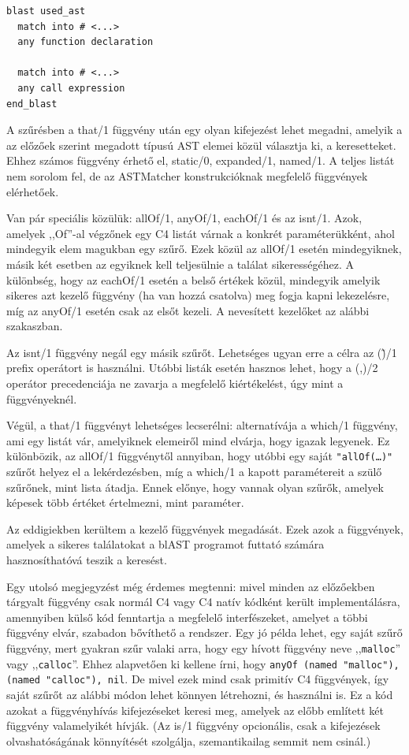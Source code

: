 \begin{lstlisting}
blast used_ast
  match into # <...>
  any function declaration

  match into # <...>
  any call expression
end_blast
\end{lstlisting}

A szűrésben a \cfn that/1 függvény után egy olyan kifejezést lehet megadni, amelyik a az előzőek szerint megadott típusú \gls{AST} elemei közül választja ki, a keresetteket.
Ehhez számos függvény érhető el, \pl \cfn static/0, \cfn expanded/1, \cfn named/1.
A teljes listát nem sorolom fel, de az ASTMatcher konstrukcióknak megfelelő függvények elérhetőek.

Van pár speciális közülük: \cfn allOf/1, \cfn anyOf/1, \cfn eachOf/1 és az \cfn isnt/1.
Azok, amelyek ,,Of''-al végzőnek egy C4 listát várnak a konkrét paraméterükként, ahol mindegyik elem magukban egy szűrő.
Ezek közül az \cfn allOf/1 esetén mindegyiknek, másik két esetben az egyiknek kell teljesülnie a találat sikerességéhez.
A különbség, hogy az \cfn eachOf/1 esetén a belső értékek közül, mindegyik amelyik sikeres azt kezelő függvény (ha van hozzá csatolva) meg fogja kapni lekezelésre, míg az \cfn anyOf/1 esetén csak az elsőt kezeli.
A nevesített kezelőket \ld az alábbi szakaszban.

Az \cfn isnt/1 függvény negál egy másik szűrőt.
Lehetséges ugyan erre a célra az \cfn (\~)/1 prefix operátort is használni.
Utóbbi listák esetén hasznos lehet, hogy a \cfn (,)/2 operátor precedenciája ne zavarja a megfelelő kiértékelést, úgy mint a függvényeknél.

Végül, a \cfn that/1 függvényt lehetséges lecserélni: alternatívája a \cfn which/1 függvény, ami egy listát vár, amelyiknek elemeiről mind elvárja, hogy igazak legyenek.
Ez különbözik, az \cfn allOf/1 függvénytől annyiban, hogy utóbbi egy saját {\tt "allOf(\dots)"} szűrőt helyez el a lekérdezésben, míg a \cfn which/1 a kapott paramétereit a szülő szűrőnek, mint lista átadja.
Ennek előnye, hogy vannak olyan szűrők, amelyek képesek több értéket értelmezni, mint paraméter.

Az eddigiekben kerültem a kezelő függvények megadását.
Ezek azok a függvények, amelyek a sikeres találatokat a blAST programot futtató számára hasznosíthatóvá teszik a keresést.

Egy utolsó megjegyzést még érdemes megtenni: mivel minden az előzőekben tárgyalt függvény csak normál C4 vagy C4 natív kódként került implementálásra, amennyiben külső kód fenntartja a megfelelő interfészeket, amelyet a többi függvény elvár, szabadon bővíthető a rendszer.
Egy jó példa lehet, egy saját szűrő függvény, mert gyakran szűr valaki arra, hogy egy hívott függvény neve ,,{\tt malloc}'' vagy ,,{\tt calloc}''.
Ehhez alapvetően ki kellene írni, hogy {\tt anyOf (named "malloc"), (named "calloc"), nil}.
De mivel ezek mind csak primitív C4 függvények, így saját szűrőt az alábbi módon lehet könnyen létrehozni, és használni is.
Ez a kód azokat a függvényhívás kifejezéseket keresi meg, amelyek az előbb említett két függvény valamelyikét hívják.
(Az \cfn is/1 függvény opcionális, csak a kifejezések olvashatóságának könnyítését szolgálja, szemantikailag semmit nem csinál.)

